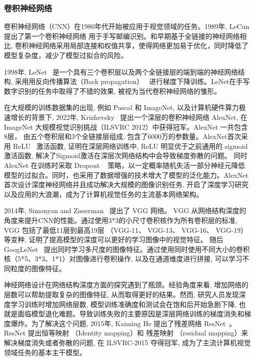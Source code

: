 \subsubsection{卷积神经网络}
卷积神经网络（CNN）在1980年代开始被应用于视觉领域的任务。1989年, LeCun 提出了第一个卷积神经网络\cite{lecun1989backpropagation} 用于手写邮编识别。和早期基于全链接的神经网络相比, 卷积神经网络采用局部连接和权值共享，使得网络更加易于优化，同时降低了模型复杂度，减少了模型过拟合的风险。\par
1998年, LeNet~\cite{lecun1998gradient} 是一个具有三个卷积层以及两个全链接层的端到端的神经网络结构, 采用用反向传播算法（Back propagation）~\cite{} 进行梯度下降训练。LeNet在手写数字识别的任务中取得了不错的效果, 被视为当代卷积神经网络的雏形。\par
在大规模的训练数据集的出现, 例如 Pascal 和 ImageNet, 以及计算机硬件算力极速增长的背景下, 2022年, Krizhevsky~\cite{krizhevsky2017imagenet} 提出一个深层的卷积神经网络 AlexNet, 在ImageNet 大规模视觉识别挑战（ILSVRC 2012）中获得冠军。AlexNet 一共包含8层， 由五个卷积层和3个全链接层组成, 包含了6000万的参数量。AlexNet首次采用 ReLU~\cite{glorot2011deep} 激活函数, 证明在深层网络训练中, ReLU 明显优于之前通用的 sigmoid 激活函数, 解决了Sigmoid激活在深层次网络结构中会导致梯度弥散的问题。 同时AlexNet 在训练时采取 Dropout ~\cite{srivastava2014dropout} 策略，以一定概率随机失活一部分神经元降低模型的过拟合。同时，也采用了数据增强的技术增大了模型的泛化能力。AlexNet 首次设计深度神经网络并且成功解决大规模的图像识别任务, 开启了深度学习研究以及应用的大浪潮，成为了计算机视觉任务的主流基本网络架构。 \par
2014年, Simonyan and Zisserman~\cite{simonyan2014very} 提出了 VGG 网络。 VGG 从网络结构深度的角度来提升CNN的性能。通过使用3*3的小尺寸卷积核作为所有卷积层的标准, VGG 包括了最低11层到最高19层 （VGG-11、 VGG-13、 VGG-16、 VGG-19）等变种, 证明了提高模型的深度可以更好的学习图像中的视觉特征。 随后 GoogLeNet~\cite{szegedy2015going} 提出同时学习多尺度的图像特征。通过使用同时使用不同大小的卷积核（5*5、3*3、1*1）对图像进行卷积操作, 以及在通道维度进行拼接, 可以学习不同粒度的图像特征。\par
神经网络设计在网络结构深度方面的探究遇到了瓶颈。经验角度来看, 增加网络的层数可以帮助提取复杂的图像特征, 从而取得更好的结果。然而, 研究人员发现深度学习训练时增加网络层数, 模型训练准确度和测试会在饱和后开始急剧下降, 也就是面临模型退化难题。导致训练失败的主要原因是深层网络训练的梯度消失和梯度爆炸。为了解决这个问题, 2015年, Kaiming He 提出了残差网络 ResNet~\cite{he2016deep}。 ResNet 提出恒等映射 （Identity mapping）和 残差映射 （residual mapping）来解决梯度消失或者弥散的问题, 在 ILSVRC-2015 夺得冠军, 成为了主流计算机视觉领域任务的基本主干模型。\par
